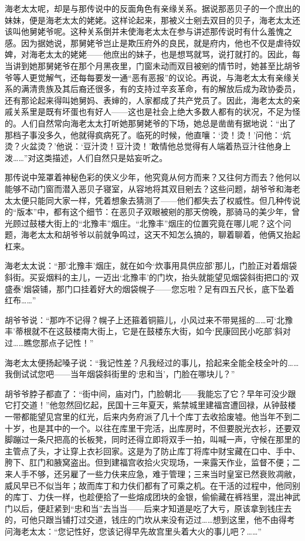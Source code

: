\par 海老太太呢，却是与那传说中的反面角色有亲缘关系。据说那恶贝子的一个庶出的妹妹，便是海老太太的姥姥。这样论起来，那被义士剜去双目的贝子，海老太太还该叫他舅姥爷呢。这种关系倒并未使海老太太在参与讲述那传说时有什么羞愧之感。因为据她说，那舅姥爷岂止是欺压府外的良民，就是府内，他也不仅是虐待奴婢，对海老太太的姥姥——他庶出的妹子，也是想骂就骂，说打就打的。因此，每当讲到她那舅姥爷在那个月黑夜里，门窗未动而双目被剜的情节时，她甚至比胡爷爷等人更觉解气，还每每要发一通“恶有恶报”的议论。再说，与海老太太有亲缘关系的满清贵族及其后裔还很多，有的支持过辛亥革命，有的解放后成为政协委员，还有那论起来得叫她舅妈、表婶的，人家都成了共产党员了。因此，海老太太的亲戚关系里是既有坏蛋也有好人——这也是社会上绝大多数人都有的状况，不足为怪的。人们自然常向海老太太打听她那舅姥爷的下场，她总是凿凿有据地说：“出了那档子事没多久，他就得疯病死了。临死的时候，他直嚷：‘烫！烫！’问他：‘炕烫？火盆烫？’他说：‘豆汁烫！豆汁烫！’敢情他总觉得有人端着热豆汁往他身上泼……”对这类描述，人们自然只是姑妄听之。
\par 那传说中笼罩着神秘色彩的侠义少年，他究竟从何方而来？又往何方而去？他何以能够不动门窗而潜入恶贝子寝室，从容地将其双目剜去？这些问题，胡爷爷和海老太太便只能同大家一样，凭着想象去猜测了——他们都失去了权威性。但几种传说的“版本”中，都有这个细节：在恶贝子双眼被剜的那天傍晚，那骑马的美少年，曾光顾过鼓楼大街上的“北豫丰”烟庄。“北豫丰”烟庄的位置究竟在哪儿呢？这个问题，海老太太和胡爷爷以前就争鸣过，这天不知怎么搞的，聊着聊着，他俩又抬起杠来。
\par 海老太太说：“那‘北豫丰’烟庄，就在如今‘炊事用具供应部’那儿，门脸正对着烟袋斜街。买妥烟料的主儿，一迈出‘北豫丰’的门坎，抬头就能望见烟袋斜街把口的‘双盛泰’烟袋铺，那门口挂着好大的烟袋幌子——您忘啦？足有四五尺长，底下坠着红布……”
\par 胡爷爷说：“那咋不记得？幌子上还箍着铜箍儿，小风过来不带晃摇的……可‘北豫丰’蒂根就不在这鼓楼南大街上，它是在鼓楼东大街，如今‘民康回民小吃部’斜对过……瞧您那点子记性！”
\par 海老太太便扬起嗓子说：“我记性差？凡我经过的事儿，拾起来全能全枝全叶的……我倒试试您吧——当年烟袋斜街里的‘忠和当’，门脸在哪块儿？”
\par 胡爷爷脖子都直了：“街中间，庙对门，门脸朝北——我能忘了它？早年可没少跟它打交道！”他忽然回忆起，民国十三年夏天，紫禁城里建福宫遭回禄，从钟鼓楼一带都能望见宫里的红光，后来内务府派了几十个库丁去收拾废墟。他当年不到二十岁，也是其中的一个。以往在库里干完活，出库房时，不但要脱光衣衫，还要双脚蹦过一条尺把高的长板凳，同时还得立即将双手一拍，叫喊一声，守候在那里的主管点了头，才让穿上衣衫回家。这是为了防止库丁将库中财宝藏在口中、手中、胯下、肛门和腋窝盗出。但到建福宫收拾火灾现场，一来露天作业，监督不便；二来人手不够，还另雇了一些力伕来应急，难于管理；三来当时皇室已然衰败凋敝，威风早已不似当年；故而库丁和力伕们都有了可乘之机。在干活的过程中，他同别的库丁、力伕一样，也趁便拾了一些熔成团块的金银，偷偷藏在裤裆里，混出神武门以后，便赶紧到“忠和当”去当当——后来才知道是吃了大亏，原该拿到钱庄去的，可他只跟当铺打过交道，钱庄的门坎从来没有迈过……想到这里，他不由得考问海老太太：“您记性好，您该记得早先故宫里头着大火的事儿吧？……”
